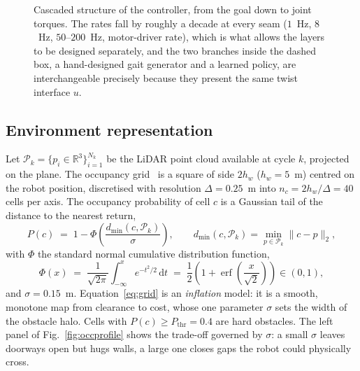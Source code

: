 \documentclass[11pt,a4paper]{article}
\newcommand{\R}{\mathbb{R}}
\begin{document}
\begin{figure}[htbp]
  \caption{Cascaded structure of the controller, from the goal down to joint torques. The
  rates fall by roughly a decade at every seam ($1$~Hz, $8$~Hz, $50$--$200$~Hz, motor-driver rate), which is
  what allows the layers to be designed separately, and the two branches inside the dashed box, a
  hand-designed gait generator and a learned policy, are interchangeable precisely because they present the
  same twist interface $u$.}
  \label{fig:cascade}
\end{figure}

\subsection{Environment representation}
\label{sec:grid}

Let $\mathcal{P}_k=\{p_i\in\R^3\}_{i=1}^{N_k}$ be the LiDAR point cloud available at cycle $k$, projected on
the plane. The occupancy grid~\cite{elfes1989occupancy} is a square of side $2h_w$ ($h_w=5$~m) centred on the robot position, discretised with
resolution $\Delta=0.25$~m into $n_c=2h_w/\Delta=40$ cells per axis. The occupancy probability of cell $c$ is
a Gaussian tail of the distance to the nearest return,
\begin{equation}
  P(c) \;=\; 1-\Phi\!\left(\frac{d_{\min}(c,\mathcal{P}_k)}{\sigma}\right),
  \qquad d_{\min}(c,\mathcal{P}_k)=\min_{p\in\mathcal{P}_k}\|c-p\|_2 ,
  \label{eq:grid}
\end{equation}
with $\Phi$ the standard normal cumulative distribution function,
\begin{equation}
  \Phi(x) \;=\; \frac{1}{\sqrt{2\pi}}\int_{-\infty}^{x}e^{-t^2/2}\,\mathrm{d}t
  \;=\; \frac{1}{2}\left(1+\operatorname{erf}\!\left(\frac{x}{\sqrt{2}}\right)\right)\in(0,1),
  \label{eq:phi}
\end{equation}
and $\sigma=0.15$~m. Equation~\eqref{eq:grid} is an \emph{inflation}
model: it is a smooth, monotone map from clearance to cost, whose one parameter $\sigma$ sets the width of
the obstacle halo. Cells with $P(c)\ge P_{\mathrm{thr}}=0.4$ are hard obstacles. The left panel of
Fig.~\ref{fig:occprofile} shows the trade-off governed by $\sigma$: a small $\sigma$ leaves doorways open but
hugs walls, a large one closes gaps the robot could physically cross.
\end{document}
